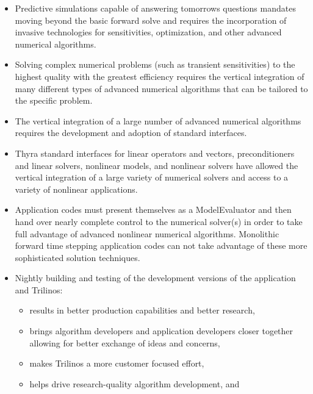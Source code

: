 \documentclass[pdf,ps2pdf,11pt]{SANDreport}
\begin{document}
{\begin{itemize}
{}\item Predictive simulations capable of answering tomorrows questions
mandates moving beyond the basic forward solve and requires the incorporation
of invasive technologies for sensitivities, optimization, and other advanced
numerical algorithms.

{}\item Solving complex numerical problems (such as transient sensitivities)
to the highest quality with the greatest efficiency requires the vertical
integration of many different types of advanced numerical algorithms that can
be tailored to the specific problem.

{}\item The vertical integration of a large number of advanced numerical
algorithms requires the development and adoption of standard interfaces.

{}\item Thyra standard interfaces for linear operators and vectors,
preconditioners and linear solvers, nonlinear models, and nonlinear solvers
have allowed the vertical integration of a large variety of numerical solvers
and access to a variety of nonlinear applications.

{}\item Application codes must present themselves as a ModelEvaluator and then
hand over nearly complete control to the numerical solver(s) in order to take
full advantage of advanced nonlinear numerical algorithms.  Monolithic forward
time stepping application codes can not take advantage of these more
sophisticated solution techniques.

{}\item Nightly building and testing of the development versions of the
application and Trilinos:

  \begin{itemize}

  {}\item results in better production capabilities and better research,

  {}\item brings algorithm developers and application developers closer
  together allowing for better exchange of ideas and concerns,

  {}\item makes Trilinos a more customer focused effort,

  {}\item helps drive research-quality algorithm development, and
        

\end{itemize}
\end{itemize}}
\end{document}
